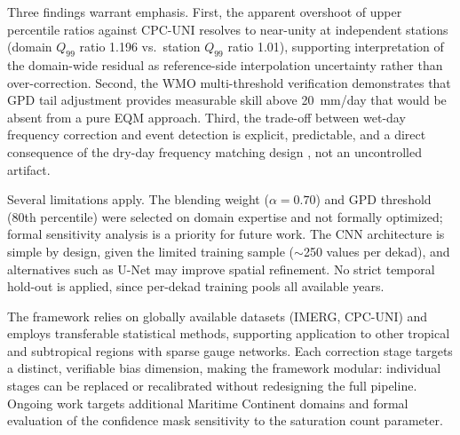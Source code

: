 \documentclass[11pt,a4paper]{article}
\begin{document}
Three findings warrant emphasis. First, the apparent overshoot of upper
percentile ratios against CPC-UNI resolves to near-unity at independent
stations (domain $Q_{99}$ ratio 1.196 vs.\ station $Q_{99}$ ratio 1.01),
supporting interpretation of the domain-wide residual as reference-side
interpolation uncertainty rather than over-correction. Second, the WMO
multi-threshold verification demonstrates that GPD tail adjustment
provides measurable skill above 20~mm/day that would be absent from a
pure EQM approach. Third, the trade-off between wet-day frequency
correction and event detection is explicit, predictable, and a direct
consequence of the dry-day frequency matching design \cite{ref11}, not an
uncontrolled artifact.

Several limitations apply. The blending weight ($\alpha = 0.70$) and
GPD threshold (80th percentile) were selected on domain expertise and
not formally optimized; formal sensitivity analysis is a priority for
future work. The CNN architecture is simple by design, given the limited
training sample ($\sim$250 values per dekad), and alternatives such as
U-Net may improve spatial refinement. No strict temporal hold-out is
applied, since per-dekad training pools all available years.

The framework relies on globally available datasets (IMERG, CPC-UNI)
and employs transferable statistical methods, supporting application to
other tropical and subtropical regions with sparse gauge networks.
Each correction stage targets a distinct, verifiable bias dimension,
making the framework modular: individual stages can be replaced or
recalibrated without redesigning the full pipeline. Ongoing work
targets additional Maritime Continent domains and formal evaluation of
the confidence mask sensitivity to the saturation count parameter.
\end{document}
